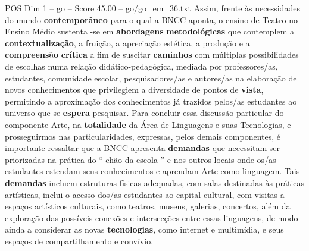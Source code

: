 \begin{textsample}{POS Dim 1 – go – Score 45.00 – go/go\_em\_36.txt}
Assim, frente às necessidades do mundo \textbf{contemporâneo} para o qual a BNCC aponta, o ensino de Teatro no Ensino Médio sustenta -se em \textbf{abordagens} \textbf{metodológicas} que contemplem a \textbf{contextualização}, a fruição, a apreciação estética, a produção e a \textbf{compreensão} \textbf{crítica} a fim de suscitar \textbf{caminhos} com múltiplas possibilidades de escolhas numa relação didático-pedagógica, mediada por professores/as, estudantes, comunidade escolar, pesquisadores/as e autores/as na elaboração de novos conhecimentos que privilegiem a diversidade de pontos de \textbf{vista}, permitindo a aproximação dos conhecimentos já trazidos pelos/as estudantes ao universo que se \textbf{espera} pesquisar.
Para concluir essa discussão particular do componente Arte, na \textbf{totalidade} da Área de Linguagens e suas Tecnologias, e prosseguirmos nas particularidades, expressas, pelos demais componentes, é importante ressaltar que a BNCC apresenta \textbf{demandas} que necessitam ser priorizadas na prática do “ chão da escola ” e nos outros locais onde os/as estudantes estendam seus conhecimentos e aprendam Arte como linguagem.
Tais \textbf{demandas} incluem estruturas físicas adequadas, com salas destinadas às práticas artísticas, inclui o acesso dos/as estudantes ao capital cultural, com visitas a espaços artísticos culturais, como teatros, museus, galerias, concertos, além da exploração das possíveis conexões e intersecções entre essas linguagens, de modo ainda a considerar as novas \textbf{tecnologias}, como internet e multimídia, e seus espaços de compartilhamento e convívio.

\end{textsample}
